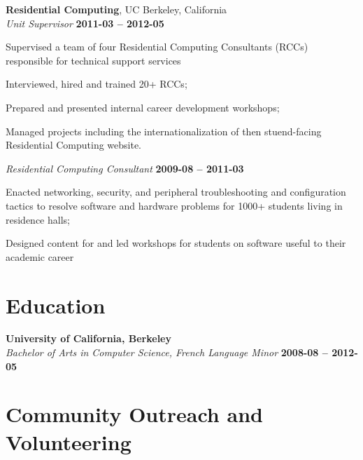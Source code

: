 \documentclass[margin,line]{resume}
\begin{document}
\begin{resume}
    \textbf{Residential Computing}, UC Berkeley, California \vspace{2mm}\\\vspace{0mm}%
    \textsl{Unit Supervisor} \hfill \textbf{2011-03 -- 2012-05}
    \begin{list2}
		\item Supervised a team of four Residential Computing Consultants (RCCs) responsible for technical support services
		\item Interviewed, hired and trained 20+ RCCs;
		\item Prepared and presented internal career development workshops;
		\item Managed projects including the internationalization of then stuend-facing Residential Computing website.
    \end{list2}\vspace{-1.5mm}


	\textsl{Residential Computing Consultant} \hfill \textbf{2009-08 -- 2011-03}
	\begin{list2}
		\item Enacted networking, security, and peripheral troubleshooting and configuration tactics to resolve software and hardware problems for 1000+ students living in residence halls;
		\item Designed content for and led workshops for students on software useful to their academic career
	\end{list2}\vspace{-1.5mm}

    \section{\mysidestyle Education}

    \textbf{University of California, Berkeley}\vspace{1mm}\\\vspace{0mm}%
    \setlength{\leftmargin}{0.25in}
    \textsl{Bachelor of Arts in Computer Science, French Language Minor} \hfill \textbf{2008-08 -- 2012-05} \vspace{-1.5mm}

	\section{\mysidestyle Community Outreach and Volunteering}


\end{resume}
\end{document}
